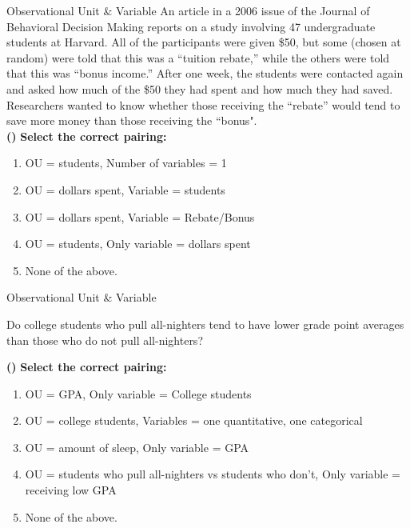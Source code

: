 \documentclass[13pt]{beamer}
\newcounter{count}
\newcommand{\question}{ \textbf{(\decimal{count})} \stepcounter{count}}
\begin{document}
\begin{frame}{Observational Unit \& Variable}
\small{An article in a 2006 issue of the Journal of Behavioral Decision Making reports on a study involving 47 undergraduate students at Harvard. All of the participants were given \$50, but some (chosen at random) were told that this was a “tuition rebate,” while the others were told that this was ``bonus income.” After one week, the students were contacted again and asked how much of the \$50 they had spent and how much they had saved. Researchers wanted to know whether those receiving the “rebate” would tend to save more money than those receiving the ``bonus".}\\

\question \textbf{Select the correct pairing:}

\begin{enumerate}[A]
	\item OU = students, Number of variables = 1
    \item OU = dollars spent, Variable = students
    \item OU = dollars spent, Variable = Rebate/Bonus
    \item OU = students, Only variable = dollars spent
    \item None of the above.
\end{enumerate}

\end{frame}

\begin{frame}{Observational Unit \& Variable}

Do college students who pull all-nighters tend to have lower grade point averages than those who do not pull all-nighters?

\vspace*{0.1in}

\question \textbf{Select the correct pairing:}

\begin{enumerate}[A]
	\item OU = GPA, Only variable = College students
    \item OU = college students, Variables = one quantitative, one categorical
    \item OU = amount of sleep, Only variable = GPA
    \item OU = students who pull all-nighters vs students who don't, Only variable = receiving low GPA
    \item None of the above.
\end{enumerate}

\end{frame}
\end{document}
